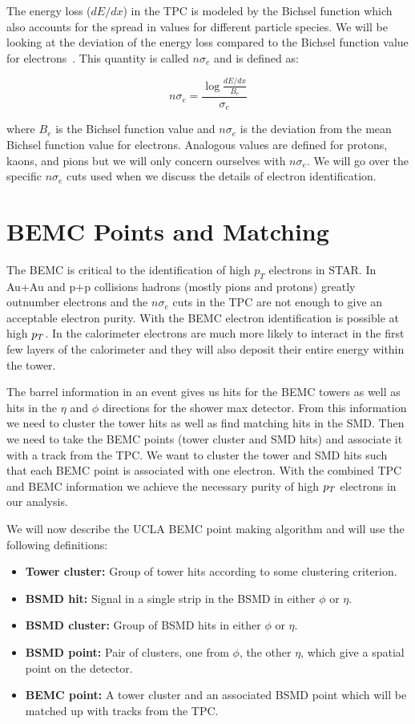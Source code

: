 The energy loss ($dE/dx$) in the TPC is modeled by the Bichsel function which also accounts for the spread in values for different particle species. We will be looking at the deviation of the energy loss compared to the Bichsel function value for electrons~\cite{bichsel}. This quantity is called $n\sigma_e$ and is defined as:

\begin{equation}\label{eq:nsigmae}
n\sigma_e = \frac{\log{\frac{dE/dx}{B_e}}}{\sigma_e}
\end{equation}

where $B_e$ is the Bichsel function value and $n\sigma_e$ is the deviation from the mean Bichsel function value for electrons. Analogous values are defined for protons, kaons, and pions but we will only concern ourselves with $n\sigma_e$. We will go over the specific $n\sigma_e$ cuts used when we discuss the details of electron identification. 

\section{BEMC Points and Matching}

The BEMC is critical to the identification of high $p_T$ electrons in STAR. In Au+Au and p+p collisions hadrons (mostly pions and protons) greatly outnumber electrons and the $n\sigma_e$ cuts in the TPC are not enough to give an acceptable electron purity. With the BEMC electron identification is possible at high $p_{T}$. In the calorimeter electrons are much more likely to interact in the first few layers of the calorimeter and they will also deposit their entire energy within the tower. 

The barrel information in an event gives us hits for the BEMC towers as well as hits in the $\eta$ and $\phi$ directions for the shower max detector. From this information we need to cluster the tower hits as well as find matching hits in the SMD. Then we need to take the BEMC points (tower cluster and SMD hits) and associate it with a track from the TPC. We want to cluster the tower and SMD hits such that each BEMC point is associated with one electron. With the combined TPC and BEMC information we achieve the necessary purity of high $p_{T}$ electrons in our analysis.

We will now describe the UCLA BEMC point making algorithm and will use the following definitions: 

\begin{itemize}
\item \textbf{Tower cluster:} Group of tower hits according to some clustering criterion.
\item \textbf{BSMD hit:} Signal in a single strip in the BSMD in either $\phi$ or $\eta$.
\item \textbf{BSMD cluster:} Group of BSMD hits in either $\phi$ or $\eta$.
\item \textbf{BSMD point:} Pair of clusters, one from $\phi$, the other $\eta$, which give a spatial point on the detector.
\item \textbf{BEMC point:} A tower cluster and an associated BSMD point which will be matched up with tracks from the TPC.
\end{itemize}

